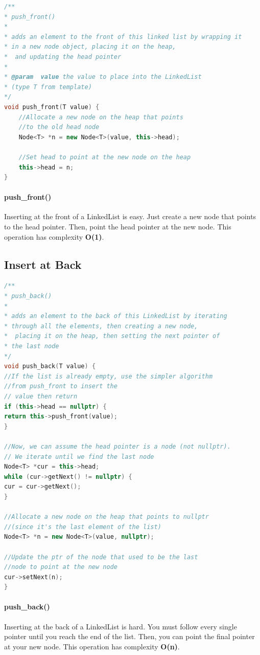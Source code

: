 \documentclass[12pt]{article}
\begin{document}
\begin{lstlisting}[language = C++]
/**
* push_front()
*
* adds an element to the front of this linked list by wrapping it
* in a new node object, placing it on the heap,
*  and updating the head pointer
*
* @param  value the value to place into the LinkedList
* (type T from template)
*/
void push_front(T value) {
	//Allocate a new node on the heap that points
	//to the old head node
	Node<T> *n = new Node<T>(value, this->head);
	
	//Set head to point at the new node on the heap
	this->head = n;
}
\end{lstlisting}

\paragraph{push\_front()}
Inserting at the front of a LinkedList is easy. Just create a new node that points to the head pointer. Then, point the head pointer at the new node. This operation has complexity \textbf{O(1)}.

\newpage

\subsection{Insert at Back}


\begin{lstlisting}[language = C++]
/**
* push_back()
*
* adds an element to the back of this LinkedList by iterating
* through all the elements, then creating a new node,
*  placing it on the heap, then setting the next pointer of
* the last node
*/
void push_back(T value) {
//If the list is already empty, use the simpler algorithm
//from push_front to insert the
// value then return
if (this->head == nullptr) {
return this->push_front(value);
}

//Now, we can assume the head pointer is a node (not nullptr).
// We iterate until we find the last node
Node<T> *cur = this->head;
while (cur->getNext() != nullptr) {
cur = cur->getNext();
}

//Allocate a new node on the heap that points to nullptr
//(since it's the last element of the list)
Node<T> *n = new Node<T>(value, nullptr);

//Update the ptr of the node that used to be the last
//node to point at the new node
cur->setNext(n);
}

\end{lstlisting}

\paragraph{push\_back()}
Inserting at the back of a LinkedList is hard. You must follow every single pointer until you reach the end of the list. Then, you can point the final pointer at your new node. This operation has complexity \textbf{O(n)}.
\end{document}
